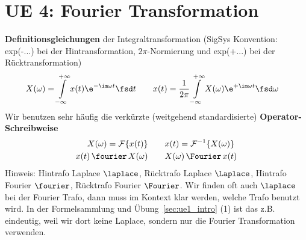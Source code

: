 \clearpage
\section{UE 4: Fourier Transformation}
\label{sec:ue4_fouriertransformation}

\textbf{Definitionsgleichungen} der Integraltransformation (SigSys Konvention:
exp(-...) bei der Hintransformation, $2\pi$-Normierung und exp(+...) bei der
Rücktransformation)
\begin{align}
X(\omega) = \int\limits_{-\infty}^{+\infty} x(t) \e^{-\im \omega t} \fsd t
&\qquad
x(t)= \frac{1}{2\pi}\int\limits_{-\infty}^{+\infty} X(\omega) \e^{+\im \omega t} \fsd \omega
\end{align}
Wir benutzen sehr häufig die verkürzte (weitgehend standardisierte)
\textbf{Operator-Schreibweise}
\begin{align}
X(\omega) = \mathcal{F}\{x(t)\}&\qquad x(t) = \mathcal{F}^{-1}\{X(\omega)\}\\
x(t) \,\fourier\, X(\omega) &\qquad X(\omega) \,\Fourier\, x(t)
\end{align}
Hinweis: Hintrafo Laplace $\laplace$, Rücktrafo Laplace $\Laplace$, Hintrafo Fourier
$\fourier$, Rücktrafo Fourier $\Fourier$.
Wir finden oft auch $\laplace$ bei der Fourier Trafo, dann muss im Kontext klar werden,
welche Trafo benutzt wird. In der Formelsammlung und Übung~\ref{sec:ue1_intro} (1)
ist das z.B. eindeutig, weil
wir dort keine Laplace, sondern nur die Fourier Transformation verwenden.
%

